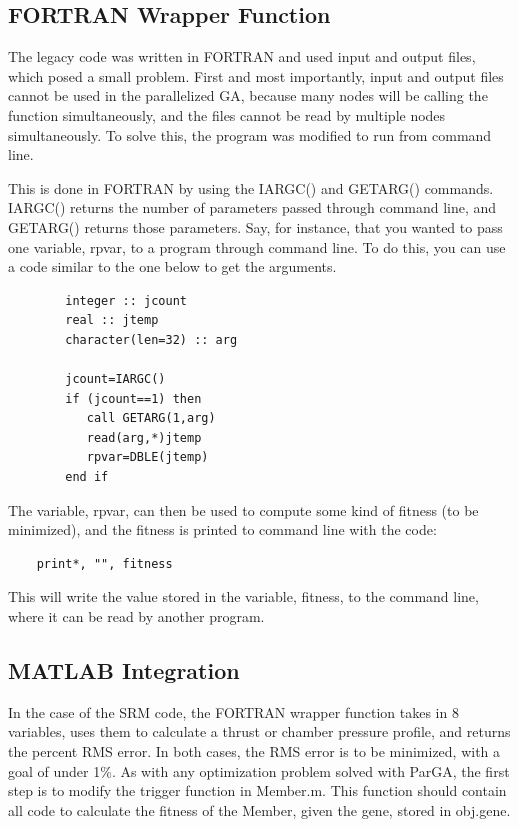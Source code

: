 \documentclass[conference]{IEEEtran}
\begin{document}
\subsection{FORTRAN Wrapper Function}

The legacy code was written in FORTRAN and used input and output files, which posed a small problem.  First and most importantly, input and output files cannot be used in the parallelized GA, because many nodes will be calling the function simultaneously, and the files cannot be read by multiple nodes simultaneously.  To solve this, the program was modified to run from command line.  

This is done in FORTRAN by using the IARGC() and GETARG() commands.  IARGC() returns the number of parameters passed through command line, and GETARG() returns those parameters.  Say, for instance, that you wanted to pass one variable, rpvar, to a program through command line.  To do this, you can use a code similar to the one below to get the arguments.

\begin{lstlisting}
        integer :: jcount
        real :: jtemp
        character(len=32) :: arg
        
        jcount=IARGC()
        if (jcount==1) then
           call GETARG(1,arg)
           read(arg,*)jtemp
           rpvar=DBLE(jtemp)
        end if
\end{lstlisting}

The variable, rpvar, can then be used to compute some kind of fitness (to be minimized), and the fitness is printed to command line with the code:

\begin{lstlisting}
	print*, "", fitness
\end{lstlisting}

This will write the value stored in the variable, fitness, to the command line, where it can be read by another program.  

\subsection{MATLAB Integration}

In the case of the SRM code, the FORTRAN wrapper function takes in 8 variables, uses them to calculate a thrust or chamber pressure profile, and returns the percent RMS error.  In both cases, the RMS error is to be minimized, with a goal of under 1\%.  As with any optimization problem solved with ParGA, the first step is to modify the trigger function in Member.m.  This function should contain all code to calculate the fitness of the Member, given the gene, stored in obj.gene. 
\end{document}
